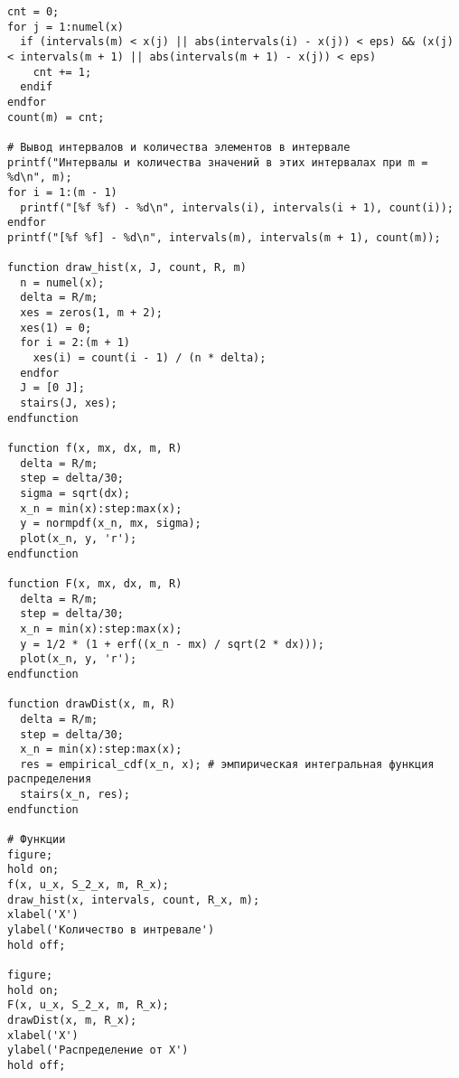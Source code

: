 \begin{lstlisting}
cnt = 0;
for j = 1:numel(x)
  if (intervals(m) < x(j) || abs(intervals(i) - x(j)) < eps) && (x(j) < intervals(m + 1) || abs(intervals(m + 1) - x(j)) < eps)
    cnt += 1;
  endif
endfor
count(m) = cnt;

# Вывод интервалов и количества элементов в интервале
printf("Интервалы и количества значений в этих интервалах при m = %d\n", m);
for i = 1:(m - 1)
  printf("[%f %f) - %d\n", intervals(i), intervals(i + 1), count(i));
endfor
printf("[%f %f] - %d\n", intervals(m), intervals(m + 1), count(m));

function draw_hist(x, J, count, R, m)
  n = numel(x);
  delta = R/m;
  xes = zeros(1, m + 2);
  xes(1) = 0;
  for i = 2:(m + 1)
    xes(i) = count(i - 1) / (n * delta);
  endfor
  J = [0 J];
  stairs(J, xes);
endfunction

function f(x, mx, dx, m, R)
  delta = R/m;
  step = delta/30;
  sigma = sqrt(dx);
  x_n = min(x):step:max(x);
  y = normpdf(x_n, mx, sigma);
  plot(x_n, y, 'r');
endfunction

function F(x, mx, dx, m, R)
  delta = R/m;
  step = delta/30;
  x_n = min(x):step:max(x);
  y = 1/2 * (1 + erf((x_n - mx) / sqrt(2 * dx)));
  plot(x_n, y, 'r');
endfunction

function drawDist(x, m, R)
  delta = R/m;
  step = delta/30;
  x_n = min(x):step:max(x);
  res = empirical_cdf(x_n, x); # эмпирическая интегральная функция распределения
  stairs(x_n, res);
endfunction

# Функции
figure;
hold on;
f(x, u_x, S_2_x, m, R_x);
draw_hist(x, intervals, count, R_x, m);
xlabel('X')
ylabel('Количество в интревале')
hold off;

figure;
hold on;
F(x, u_x, S_2_x, m, R_x);
drawDist(x, m, R_x);
xlabel('X')
ylabel('Распределение от X')
hold off;
\end{lstlisting}